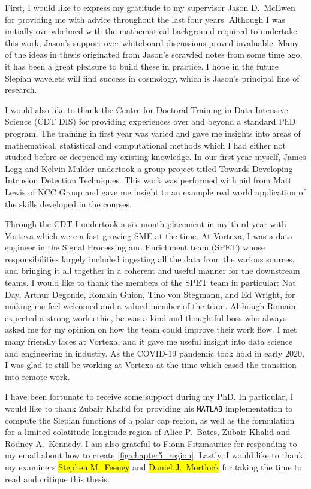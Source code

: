 \begin{acknowledgements}
	First, I would like to express my gratitude to my supervisor Jason D.~McEwen for providing me with advice throughout the last four years.
	Although I was initially overwhelmed with the mathematical background required to undertake this work, Jason's support over whiteboard discussions proved invaluable.
	Many of the ideas in thesis originated from Jason's scrawled notes from some time ago, it has been a great pleasure to build these in practice.
	I hope in the future Slepian wavelets will find success in cosmology, which is Jason's principal line of research.

	I would also like to thank the Centre for Doctoral Training in Data Intensive Science (CDT DIS) for providing experiences over and beyond a standard PhD program.
	The training in first year was varied and gave me insights into areas of mathematical, statistical and computational methods which I had either not studied before or deepened my existing knowledge.
	In our first year myself, James Legg and Kelvin Mulder undertook a group project titled Towards Developing Intrusion Detection Techniques.
	This work was performed with aid from Matt Lewis of NCC Group and gave me insight to an example real world application of the skills developed in the courses.

	Through the CDT I undertook a six-month placement in my third year with Vortexa which were a fast-growing SME at the time.
	At Vortexa, I was a data engineer in the Signal Processing and Enrichment team (SPET) whose responsibilities largely included ingesting all the data from the various sources, and bringing it all together in a coherent and useful manner for the downstream teams.
	I would like to thank the members of the SPET team in particular: Nat Day, Arthur Degonde, Romain Guion, Tino von Stegmann, and Ed Wright, for making me feel welcomed and a valued member of the team.
	Although Romain expected a strong work ethic, he was a kind and thoughtful boss who always asked me for my opinion on how the team could improve their work flow.
	I met many friendly faces at Vortexa, and it gave me useful insight into data science and engineering in industry.
	As the COVID-19 pandemic took hold in early 2020, I was glad to still be working at Vortexa at the time which eased the transition into remote work.

	I have been fortunate to receive some support during my PhD.
	In particular, I would like to thank Zubair Khalid for providing his \texttt{MATLAB} implementation to compute the Slepian functions of a polar cap region, as well as the formulation for a limited colatitude-longitude region of Alice P.~Bates, Zubair Khalid and Rodney A.~Kennedy.
	I am also grateful to Fionn Fitzmaurice for responding to my email about how to create \cref{fig:chapter5_region}.
	Lastly, I would like to thank my examiners \hl{Stephen M.~Feeney} and \hl{Daniel J.~Mortlock} for taking the time to read and critique this thesis.
\end{acknowledgements}

\setcounter{tocdepth}{2}

\tableofcontents
\listoffigures
\listoftables
